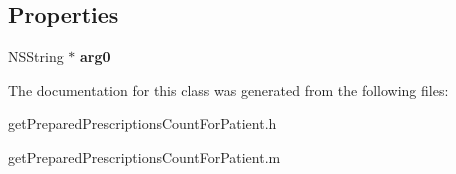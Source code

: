 \subsection*{Properties}
\begin{DoxyCompactItemize}
\item 
\hypertarget{interfaceget_prepared_prescriptions_count_for_patient_a386eae5bcdd6ccd5b4c0760bc44f67b5}{}N\+S\+String $\ast$ {\bfseries arg0}\label{interfaceget_prepared_prescriptions_count_for_patient_a386eae5bcdd6ccd5b4c0760bc44f67b5}

\end{DoxyCompactItemize}


The documentation for this class was generated from the following files\+:\begin{DoxyCompactItemize}
\item 
get\+Prepared\+Prescriptions\+Count\+For\+Patient.\+h\item 
get\+Prepared\+Prescriptions\+Count\+For\+Patient.\+m\end{DoxyCompactItemize}
